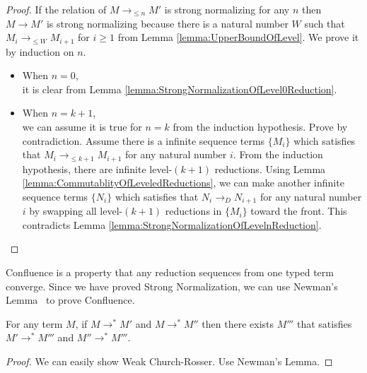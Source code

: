 \begin{proof}
    If the relation of \( M \longrightarrow_{\le n} M' \) is strong normalizing for any \( n \) then \( M \longrightarrow M' \) is strong normalizing because there is a natural number \( W \) such that $M_i \longrightarrow_{\le W} M_{i+1}$ for $i\ge 1$ from Lemma \ref{lemma:UpperBoundOfLevel}.
    We prove it by induction on \( n \).
    \begin{itemize}
        \item When \( n = 0 \), \\
            it is clear from Lemma \ref{lemma:StrongNormalizationOfLevel0Reduction}.
        \item When \( n = k + 1 \), \\
            we can assume it is true for \( n = k \) from the induction
            hypothesis. Prove by contradiction. Assume there is a infinite
            sequence terms $\{M_i\}$ which satisfies that $M_i
            \longrightarrow_{\le k+1} M_{i+1}$ for any natural number \( i \).
            From the induction hypothesis, there are infinite level-\( (k + 1) \)
            reductions. Using Lemma
            \ref{lemma:CommutablityOfLeveledReductions}, we can make another
            infinite sequence terms $\{N_i\}$ which satisfies that $N_i
            \longrightarrow_D N_{i+1}$ for any natural number \( i \) by
            swapping all level-\( (k + 1) \) reductions in \( \{ M_i \} \) toward
            the front. This contradicts Lemma
            \ref{lemma:StrongNormalizationOfLevelnReduction}.
    \end{itemize}
\end{proof}

Confluence is a property that any reduction sequences from one typed term
converge.  Since we have proved Strong Normalization, we can use Newman's
Lemma~\cite{DBLP:books/daglib/0092409} to prove Confluence.

\begin{theorem}[Confluence]
    \label{theorem:confluence}
	For any term $M$, if $M \longrightarrow^* M'$ and $M \longrightarrow^* M''$ then
	there exists $M'''$ that satisfies $M' \longrightarrow^* M'''$ and $M'' \longrightarrow^* M'''$.
\end{theorem}

\begin{proof}
  We can easily show Weak Church-Rosser. Use Newman's Lemma.
\end{proof}

